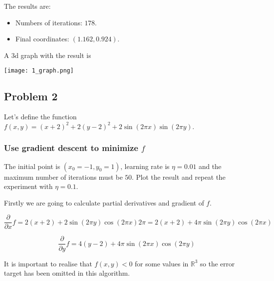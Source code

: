 The results are:

\begin{itemize}
\item Numbers of iterations: $178.$
\item Final coordinates: $( 1.162 ,  0.924 ).$
\end{itemize}

A 3d graph with the result is 

\texttt{[image: 1\_graph.png]}



\subsection{Problem 2}


Let's define the function $f(x,y) = (x+2)^2 + 2(y-2)^2 + 2 \sin (2 \pi x) \sin (2 \pi y)$.

\subsubsection{ Use gradient descent to minimize $f$}

The initial point is $(x_0 = -1, y_0 = 1)$,
learning rate is $\eta = 0.01$ and the maximum number of iterations must
be $50$.  Plot the result and repeat the experiment with  $\eta = 0.1$. 

Firstly we are going to calculate partial derivatives and gradient of $f$.

\begin{equation*}
  \frac{\partial }{\partial x} f = 2 (x + 2) + 2 \sin (2 \pi y) \cos ( 2 \pi x) 2 \pi =  2 (x + 2) +  4 \pi \sin (2 \pi y) \cos ( 2 \pi x)   
\end{equation*}

\begin{equation*}
  \frac{\partial }{\partial y} f = 4 (y - 2) +  4 \pi \sin (2 \pi x) \cos ( 2 \pi y)   
\end{equation*}


It is important to realise that $f(x,y) <0$ for some values in $\mathbb R^3$ so the error target has been omitted in this algorithm.   


